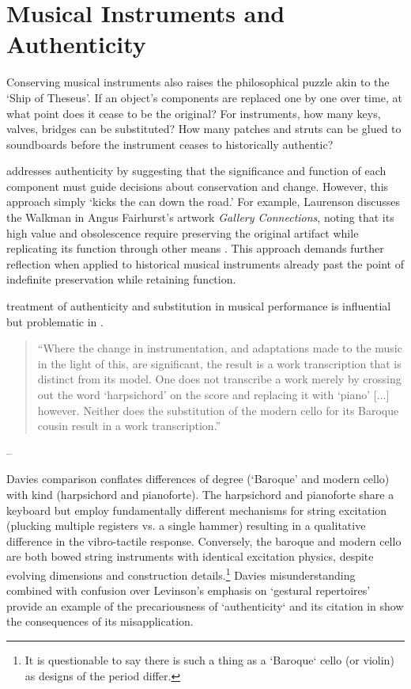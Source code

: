 \section{Musical Instruments and Authenticity}

Conserving musical instruments also raises the philosophical puzzle akin to the `Ship of Theseus'. If an object’s components are replaced one by one over time, at what point does it cease to be the original? For instruments, how many keys, valves, bridges can be substituted? How many patches and struts can be glued to soundboards before the instrument ceases to historically authentic?

\textcite{laurenson_authenticity_2006} addresses authenticity by suggesting that the significance and function of each component must guide decisions about conservation and change. However, this approach simply  `kicks the can down the road.’ For example, Laurenson discusses the Walkman in Angus Fairhurst’s artwork \textit{Gallery Connections}, noting that its high value and obsolescence require preserving the original artifact while replicating its function through other means \cite{laurenson_management_2005}. This approach demands further reflection when applied to historical musical instruments already past the point of indefinite preservation while retaining function.

\textcite{davies_authenticity_2001} treatment of authenticity and substitution in musical performance is influential but problematic in \cite{laurenson_authenticity_2006}. 

\begin{quotation}
    ``Where the change in instrumentation, and adaptations made to the music in the light of this, are significant, the result is a work transcription that is distinct from its model. One does not transcribe a work merely by crossing out the word ‘harpsichord’ on the score and replacing it with ‘piano’ [...] however. Neither does the substitution of the modern cello for its Baroque cousin result in a work transcription.''
\end{quotation}
\begin{flushright}
-- \cite[p. 222]{davies_authenticity_2001}
\end{flushright}

Davies comparison conflates differences of degree (`Baroque' and modern cello) with kind (harpsichord and pianoforte). The harpsichord and pianoforte share a keyboard but employ fundamentally different mechanisms for string excitation (plucking multiple registers vs. a single hammer) resulting in a qualitative difference in the vibro-tactile response. Conversely, the baroque and modern cello are both bowed string instruments with identical excitation physics, despite evolving dimensions and construction details.\footnote{It is questionable to say there is such a thing as a `Baroque` cello (or violin) as designs of the period differ.} Davies misunderstanding combined with confusion over Levinson's emphasis on `gestural repertoires' \cite{levinson_music_1990} provide an example of the precariousness of `authenticity` and its citation in \cite{laurenson_authenticity_2006} show the consequences of its misapplication.

